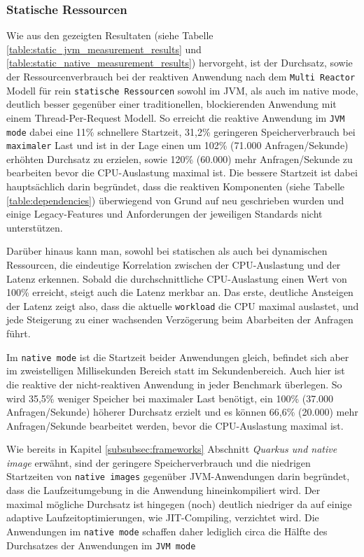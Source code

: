 \subsubsection{Statische Ressourcen}
\label{subsubsec:auswertung_static}
Wie aus den gezeigten Resultaten (siehe Tabelle \ref{table:static_jvm_measurement_results} und
\ref{table:static_native_measurement_results}) hervorgeht, ist der Durchsatz, sowie der Ressourcenverbrauch bei der
reaktiven Anwendung nach dem \verb|Multi Reactor| Modell für rein \verb|statische Ressourcen| sowohl im JVM, als auch im native mode,
deutlich besser gegenüber einer traditionellen, blockierenden Anwendung mit einem Thread-Per-Request Modell.
So erreicht die reaktive Anwendung im \verb|JVM mode| dabei eine 11\% schnellere Startzeit, 31,2\% geringeren Speicherverbrauch bei
\verb|maximaler| Last und ist in der Lage einen um 102\% (71.000 Anfragen/Sekunde) erhöhten Durchsatz zu erzielen,
sowie 120\% (60.000) mehr Anfragen/Sekunde zu bearbeiten bevor die CPU-Auslastung maximal ist.
Die bessere Startzeit ist dabei hauptsächlich darin begründet, dass die reaktiven Komponenten (siehe Tabelle \ref{table:dependencies})
überwiegend von Grund auf neu geschrieben wurden und einige Legacy-Features und Anforderungen der jeweiligen
Standards nicht unterstützen.

Darüber hinaus kann man, sowohl bei statischen als auch bei dynamischen Ressourcen, die eindeutige Korrelation zwischen der
CPU-Auslastung und der Latenz erkennen.
Sobald die durchschnittliche CPU-Auslastung einen Wert von 100\% erreicht, steigt auch die Latenz merkbar an.
Das erste, deutliche Ansteigen der Latenz zeigt also, dass die aktuelle \verb|workload| die CPU maximal auslastet,
und jede Steigerung zu einer wachsenden Verzögerung beim Abarbeiten der Anfragen führt.

Im \verb|native mode| ist die Startzeit beider Anwendungen gleich, befindet sich aber im zweistelligen Millisekunden Bereich statt
im Sekundenbereich.
Auch hier ist die reaktive der nicht-reaktiven Anwendung in jeder Benchmark überlegen. So wird 35,5\% weniger Speicher bei maximaler Last
benötigt, ein 100\% (37.000 Anfragen/Sekunde) höherer  Durchsatz erzielt und es können 66,6\% (20.000) mehr Anfragen/Sekunde bearbeitet
werden, bevor die CPU-Auslastung maximal ist.

Wie bereits in Kapitel \ref{subsubsec:frameworks} Abschnitt \textit{Quarkus und native image} erwähnt, sind der geringere Speicherverbrauch und
die niedrigen Startzeiten von \verb|native images| gegenüber JVM-Anwendungen darin begründet, dass die Laufzeitumgebung in die
Anwendung hineinkompiliert wird. Der maximal mögliche Durchsatz ist hingegen (noch) deutlich niedriger da auf einige adaptive
Laufzeitoptimierungen, wie JIT-Compiling, verzichtet wird. Die Anwendungen im \verb|native mode| schaffen daher lediglich
circa die Hälfte des Durchsatzes der Anwendungen im \verb|JVM mode|

